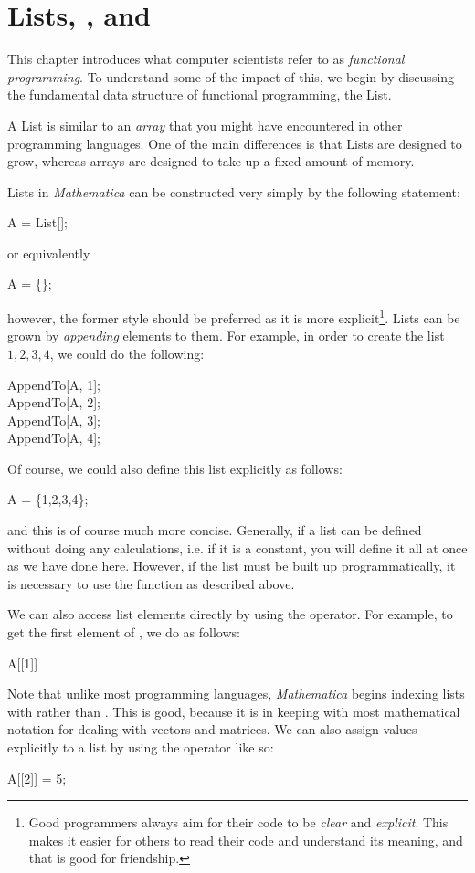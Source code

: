 \chapter{Lists, , and }
\label{chap:ListsMap}
This chapter introduces what computer scientists refer to as \emph{functional programming}. To understand some of the impact of this, we begin by discussing the fundamental data structure of functional programming, the List.

A List is similar to an \emph{array} that you might have encountered in other programming languages. One of the main differences is that Lists are designed to grow, whereas arrays are designed to take up a fixed amount of memory.

Lists in \emph{Mathematica} can be constructed very simply by the following statement:
\begin{code}
	   A = List[];
\end{code}
or equivalently
\begin{code}
	   A = \{\};
\end{code}
however, the former style should be preferred as it is more explicit\footnote{Good programmers always aim for their code to be \emph{clear} and \emph{explicit}. This makes it easier for others to read their code and understand its meaning, and that is good for friendship.}. Lists can be grown by \emph{appending} elements to them. For example, in order to create the list $1,2,3,4$, we could do the following:
\begin{code}
	   AppendTo[A, 1];\\
	   AppendTo[A, 2];\\
	   AppendTo[A, 3];\\
	   AppendTo[A, 4];
\end{code}

Of course, we could also define this list explicitly as follows:
\begin{code}
	   A = \{1,2,3,4\};
\end{code}
and this is of course much more concise. Generally, if a list can be defined without doing any calculations, i.e. if it is a constant, you will define it all at once as we have done here. However, if the list must be built up programmatically, it is necessary to use the  function as described above.

We can also access list elements directly by using the \expr{[[]]} operator. For example, to get the first element of , we do as follows:
\begin{code}
	   A[[1]]
\end{code}
Note that unlike most programming languages, \emph{Mathematica} begins indexing lists with  rather than . This is good, because it is in keeping with most mathematical notation for dealing with vectors and matrices. We can also assign values explicitly to a list by using the \expr{[[]]=} operator like so:
\begin{code}
	   A[[2]] = 5;
\end{code}

